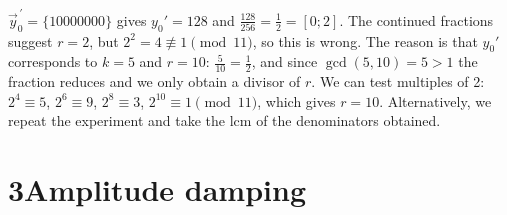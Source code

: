 \documentclass[11pt,a4paper]{article}
\begin{document}
\begin{enumerate}
$\vec y_0^{\,\prime}=\{10000000\}$ gives $y_0'=128$ and $\frac{128}{256}=\frac12=[0;2]$. The
continued fractions suggest $r=2$, but $2^2=4\not\equiv1\pmod{11}$, so this is wrong. The reason is
that $y_0'$ corresponds to $k=5$ and $r=10$: $\frac5{10}=\frac12$, and since $\gcd(5,10)=5>1$ the
fraction reduces and we only obtain a divisor of $r$. We can test multiples of 2:
$2^4\equiv5$, $2^6\equiv9$, $2^8\equiv3$, $2^{10}\equiv1\pmod{11}$, which gives $r=10$. Alternatively,
we repeat the experiment and take the lcm of the denominators obtained.

\end{enumerate}

\section*{3\quad Amplitude damping}
\end{document}

